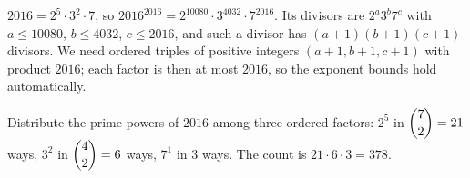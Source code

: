 $2016=2^5\cdot3^2\cdot7$, so $2016^{2016}=2^{10080}\cdot3^{4032}\cdot7^{2016}$. Its divisors are $2^a3^b7^c$ with $a\le10080$, $b\le4032$, $c\le2016$, and such a divisor has $(a+1)(b+1)(c+1)$ divisors. We need ordered triples of positive integers $(a+1,b+1,c+1)$ with product $2016$; each factor is then at most $2016$, so the exponent bounds hold automatically.

Distribute the prime powers of $2016$ among three ordered factors: $2^5$ in $\dbinom{7}{2}=21$ ways, $3^2$ in $\dbinom42=6$ ways, $7^1$ in $3$ ways. The count is $21\cdot6\cdot3=\boxed{378}$.
